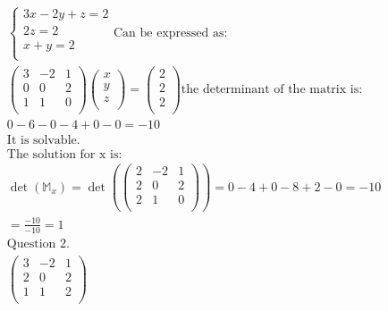 \documentclass{article}
\begin{document}
\begin{align*}
    \begin{cases}
        3x - 2y + z = 2 \\
        2z = 2          \\
        x + y = 2       \\
    \end{cases}
    \textrm{Can be expressed as:}              \\
    \begin{pmatrix}
        3 & -2 & 1 \\
        0 & 0  & 2 \\
        1 & 1  & 0 \\
    \end{pmatrix}
    \begin{pmatrix}
        x \\
        y \\
        z \\
    \end{pmatrix}
    =
    \begin{pmatrix}
        2 \\
        2 \\
        2 \\
    \end{pmatrix}
    \textrm{the determinant of the matrix is:} \\
    0 - 6 - 0 - 4 + 0 - 0 = -10                \\
    \textrm{It is solvable.}                   \\
    \textrm{The solution for x is:}            \\
    \det(\mathbb{M}_x) =
    \det(\begin{pmatrix}
                 2 & -2 & 1 \\
                 2 & 0  & 2 \\
                 2 & 1  & 0 \\
             \end{pmatrix})
    = 0 - 4 + 0 - 8 + 2 - 0 = -10              \\
    = \frac{-10}{-10} = 1                      \\
    \textrm{Question 2.}                       \\
    \begin{pmatrix}
        3 & -2 & 1 \\
        2 & 0  & 2 \\
        1 & 1  & 2 \\
    \end{pmatrix}

\end{align*}
\end{document}
